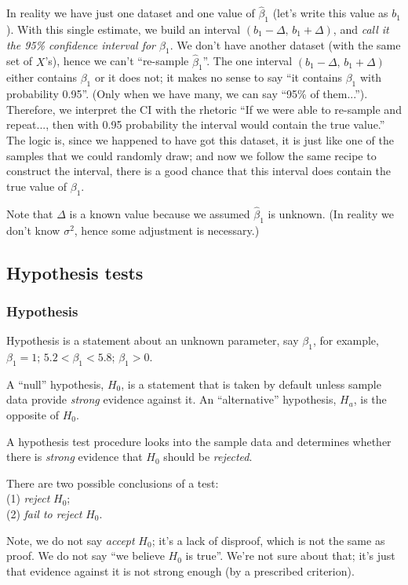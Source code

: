 \documentclass[12pt]{article}
\begin{document}
In reality we have just one dataset and one value of $\hat\beta_1$
(let's write this value as $b_1$).
With this single estimate,
we build an interval $(b_1 - \Delta,\, b_1 + \Delta)$,
and \emph{call it the 95\% confidence interval for $\beta_1$}.
We don't have another dataset (with the same set of $X$'s),
hence we can't ``re-sample $\hat\beta_1$''.
The one interval
$(b_1 - \Delta,\, b_1 + \Delta)$
either contains $\beta_1$ or it does not;
it makes no sense to say ``it contains $\beta_1$ with probability
0.95''.
(Only when we have many, we can say ``95\% of them...'').
Therefore,
we interpret the CI with the rhetoric
``If we were able to re-sample and repeat..., then with 0.95 probability
the interval would contain the true value.''
The logic is,
since we happened to have got this dataset,
it is just like one of the samples that we could randomly draw;
and now we follow the same recipe to construct the interval,
there is a good chance that this interval does contain the true value of
$\beta_1$.

Note that $\Delta$ is a known value because we assumed
$\hat\beta_1$ is unknown.
(In reality we don't know $\sigma^2$, hence some adjustment is
necessary.)

\subsection{Hypothesis tests}

\subsubsection{Hypothesis}

Hypothesis is a statement about an
unknown parameter, say $\beta_1$, for example,
$\beta_1 = 1$; $5.2 < \beta_1 < 5.8$; $\beta_1 > 0$.

A ``null'' hypothesis, $H_0$,
is a statement that is taken by default unless
sample data provide \emph{strong} evidence against it.
An ``alternative'' hypothesis, $H_a$, is the opposite of $H_0$.

A hypothesis test procedure looks into the sample data and
determines whether there is
\emph{strong} evidence that $H_0$ should be \emph{rejected}.

There are two possible conclusions of a test:\\
(1) \emph{reject} $H_0$;\\
(2) \emph{fail to reject} $H_0$.

Note, we do not say \emph{accept} $H_0$;
it's a lack of disproof, which is not the same as proof.
We do not say ``we believe $H_0$ is true''.
We're not sure about that; it's just that evidence against it is not
strong enough (by a prescribed criterion).
\end{document}

